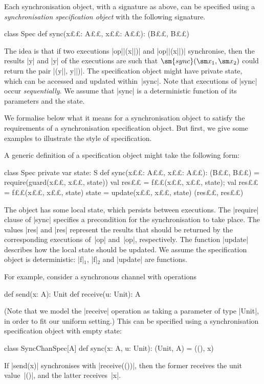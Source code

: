 Each synchronisation object, with a signature as above, can be specified using
a \emph{synchronisation specification object} with the following signature.
%
\begin{scala}
class Spec{
  def sync(x££: A££, x££: A££): (B££, B££)
}
\end{scala}
%
The idea is that if two executions |op||(x||)| and |op||(x||)|
synchronise, then the results |y| and |y| of the executions are such
that $\sm{sync}(\sm x_1, \sm x_2)$ could return the pair |(y||, y||)|.
The specification object might have private state, which can be accessed and
updated within~|sync|.  Note that executions of |sync| occur
\emph{sequentially}.  We assume that |sync| is a deterministic function of its
parameters and the state.

We formalise below what it means for a synchronisation object to satisfy the
requirements of a synchronisation specification object.  But first, we give
some examples to illustrate the style of specification. 

A generic definition of a specification object might take the following form: 
%
\begin{scala}
class Spec{
  private var state: S
  def sync(x££: A££, x££: A££): (B££, B££) = {
    require(guard(x££, x££, state))
    val res££ = f££(x££, x££, state); val res££ = f££(x££, x££, state)
    state = update(x££, x££, state)
    (res££, res££)
  }
}
\end{scala}
%
The object has some local state, which persists between executions.  The
|require| clause of |sync| specifies a precondition for the synchronisation to
take place.  The values |res| and |res| represent the results that
should be returned by the corresponding executions of~|op| and~|op|,
respectively.  The function |update| describes how the local state should be
updated.  We assume the specification object is deterministic: |f|$_1$, |f|$_2$
and |update| are functions. 

For example, consider a synchronous channel with operations
\begin{scala}
def send(x: A): Unit
def receive(u: Unit): A
\end{scala}
%
(Note that we model the |receive| operation as taking a parameter of type
|Unit|, in order to fit our uniform setting.) 
%
This can be specified using a synchronisation specification object
with empty state:
%
\begin{scala}
class SyncChanSpec[A]{
  def sync(x: A, u: Unit): (Unit, A) = ((), x)
}
\end{scala}
%
If |send(x)| synchronises with |receive(())|, then the former receives the
unit value~|()|, and the latter receives~|x|. 

